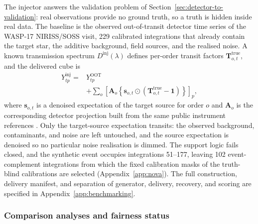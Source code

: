 The injector answers the validation problem of
Section~\ref{sec:detector-to-validation}: real observations provide no
ground truth, so a truth is hidden inside real data. The baseline is the
observed out-of-transit detector time series of the WASP-17 NIRISS/SOSS
visit, 229 calibrated integrations that already contain the target star,
the additive background, field sources, and the realised noise. A known
transmission spectrum $D^{\mathrm{inj}}(\lambda)$ defines per-order
transit factors $\bm{T}^{\mathrm{true}}_{o,t}$, and the delivered cube is
\begin{equation}
\begin{split}
 Y^{\mathrm{inj}}_{tp}
 = {}& Y^{\mathrm{OOT}}_{tp} \\
 & + \sum_{o}\left[\bm{A}_o\!\left\{\bm{s}_{o,t}\odot
   \left(\bm{T}^{\mathrm{true}}_{o,t}-\bm{1}\right)\right\}\right]_p ,
\end{split}
 \label{eq:v45-injector}
\end{equation}
where $\bm{s}_{o,t}$ is a denoised expectation of the target source for
order $o$ and $\bm{A}_o$ is the corresponding detector projection built
from the same public instrument references
\citep{BainesEtAl2023Trace,BainesEtAl2023Wavelength,DarveauBernierEtAl2022}.
Only the target-source expectation transits: the observed background,
contaminants, and noise are left untouched, and the source expectation is
denoised so no particular noise realisation is dimmed. The support logic
fails closed, and the synthetic event occupies integrations 51--177,
leaving 102 event-complement integrations from which the fixed
calibration masks of the truth-blind calibrations are selected
(Appendix~\ref{app:nova}). The full construction, delivery manifest, and
separation of generator, delivery, recovery, and scoring are specified in
Appendix~\ref{app:benchmarking}.

\subsubsection{Comparison analyses and fairness status}



